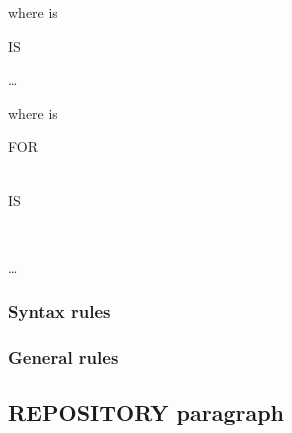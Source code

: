 where  is

\begin{syntax}[\miscextcolour]
   
  \begin{1=}
    \identifier IS \literal
  \end{1=}\ldots
\end{syntax}

where  is

\begin{syntax}
  \begin{0-1}
    FOR  \\
     \\
  \end{0-1}
   IS
  \begin{1=}
    \literal
    \begin{0-1}
      \begin{1=}
         \\
      \end{1=}
      \literal
    \end{0-1}
  \end{1=}\ldots

\end{syntax}

\subsubsection{Syntax rules}

\subsubsection{General rules}

\subsection{REPOSITORY paragraph}

